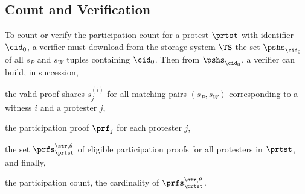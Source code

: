 \subsection{Count and Verification}%
\label{ProtocolVerification}



To count or verify the participation count for a protest \(\prtst\) with identifier 
\(\cid_0\), a verifier must download from the storage system \(\TS\) the set 
\(\pshs_{\cid_0}\) of all \(s_P\) and \(s_W\) tuples containing \(\cid_0\).
Then from \(\pshs_{\cid_0}\), a verifier can build, in succession,
\begin{enumerate*}
\item the valid proof shares \(s_j^{(i)}\) for all matching pairs \((s_P, 
    s_W)\) corresponding to a witness \(i\) and a protester \(j\),
\item the participation proof \(\prf_{j}\) for each protester \(j\),
\item the set \(\prfs_{\prtst}^{\str,\theta}\) of eligible participation proofs 
  for all protesters in \(\prtst\), and finally,
\item the participation count, \ie the cardinality of 
  \(\prfs_\prtst^{\str,\theta}\).
\end{enumerate*}


